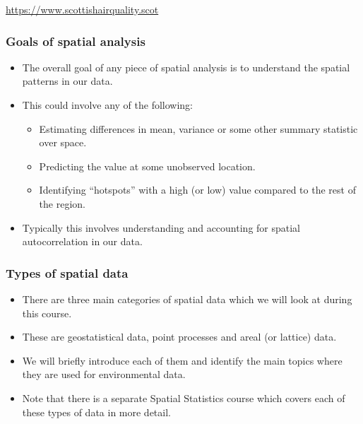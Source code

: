 \documentclass[parskip,12pt]{beamer}
\begin{document}
\begin{frame}
\begin{columns}
\begin{column}{0.5\textwidth}
\begin{center}
          \end{center}
\end{column}
\end{columns}
\vspace{2mm}
\url{https://www.scottishairquality.scot}
\end{frame}


\begin{frame}
\frametitle{Goals of spatial analysis}
 \begin{itemize}
\item The overall goal of any piece of spatial analysis is to understand the spatial patterns in our data.
\vspace{3mm}
\item This could involve any of the following:
\vspace{2mm}
\begin{itemize}
\item Estimating differences in mean, variance or some other summary statistic over space.
\vspace{2mm}
\item Predicting the value at some unobserved location.
\vspace{2mm}
\item Identifying ``hotspots'' with a high (or low) value compared to the rest of the region.
\end{itemize}
\vspace{3mm}
\item Typically this involves understanding and accounting for spatial autocorrelation in our data.
\end{itemize}
\end{frame}


\begin{frame}
\frametitle{Types of spatial data}
 \begin{itemize}
\item There are three main categories of spatial data which we will look at during this course.
\vspace{3mm}
\item These are geostatistical data, point processes and areal (or lattice) data.
\vspace{3mm}
\item We will briefly introduce each of them and identify the main topics where they are used for environmental data.
\vspace{3mm}
\item Note that there is a separate Spatial Statistics course which covers each of these types of data in more detail.
\end{itemize}
\end{frame}
\end{document}
